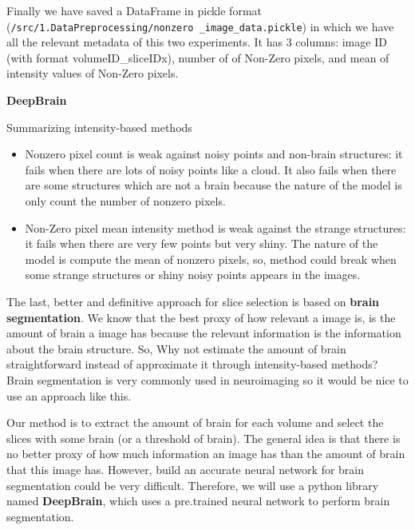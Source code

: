 Finally we have saved a DataFrame in pickle format (\texttt{/src/1.DataPreprocessing/nonzero \_image\-\_data.pickle}) in which we have all the relevant metadata of this two experiments. It has 3 columns: image ID (with format volumeID\_sliceIDx), number of of Non-Zero pixels, and mean of intensity values of Non-Zero pixels.


\FloatBarrier


\textbf{DeepBrain}

Summarizing intensity-based methods
\begin{itemize}
    \item Nonzero pixel count is weak against noisy points and non-brain structures: it fails when there are lots of noisy points like a cloud. It also fails when there are some structures which are not a brain because the nature of the model is only count the number of nonzero pixels.
    \item Non-Zero pixel mean intensity method is weak against the strange structures: it fails when there are very few points but very shiny. The nature of the model is compute the mean of nonzero pixels, so, method could break when some strange structures or shiny noisy points appears in the images.
\end{itemize}

The last, better and definitive approach for slice selection is based on \textbf{brain segmentation}. We know that the best proxy of how relevant a image is, is the amount of brain a image has because the relevant information is the information about the brain structure. So, Why not estimate the amount of brain straightforward instead of approximate it through intensity-based methods? Brain segmentation is very commonly used in neuroimaging so it would be nice to use an approach like this.

Our method is to extract the amount of brain for each volume and select the slices with some brain (or a threshold of brain). The general idea is that there is no better proxy of how much information an image has than the amount of brain that this image has. However, build an accurate neural network for brain segmentation could be very difficult. Therefore, we will use a python library named \textbf{DeepBrain}, which uses a pre.trained neural network to perform brain segmentation.

